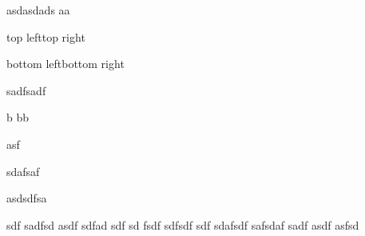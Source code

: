 \documentclass[
	final,
	a4paper,
	oneside,
	parskip=full,
	headings=standardclasses,
	headings=big,
	pointednumbers,
    pagesize,
    fleqn
]{scrartcl}
\begin{document}

    asdasdads aa
    

    \begin{landscape}
      \Huge
      \noindent
      top left\hfill top right\par
      \vfill
      \noindent
      bottom left\hfill bottom right
    \end{landscape}


    sadfsadf

    b bb

    asf

    sdafsaf

    asdsdfsa

    sdf sadfsd asdf sdfad sdf sd fsdf sdfsdf sdf sdafsdf safsdaf sadf asdf asfsd
\end{document}
